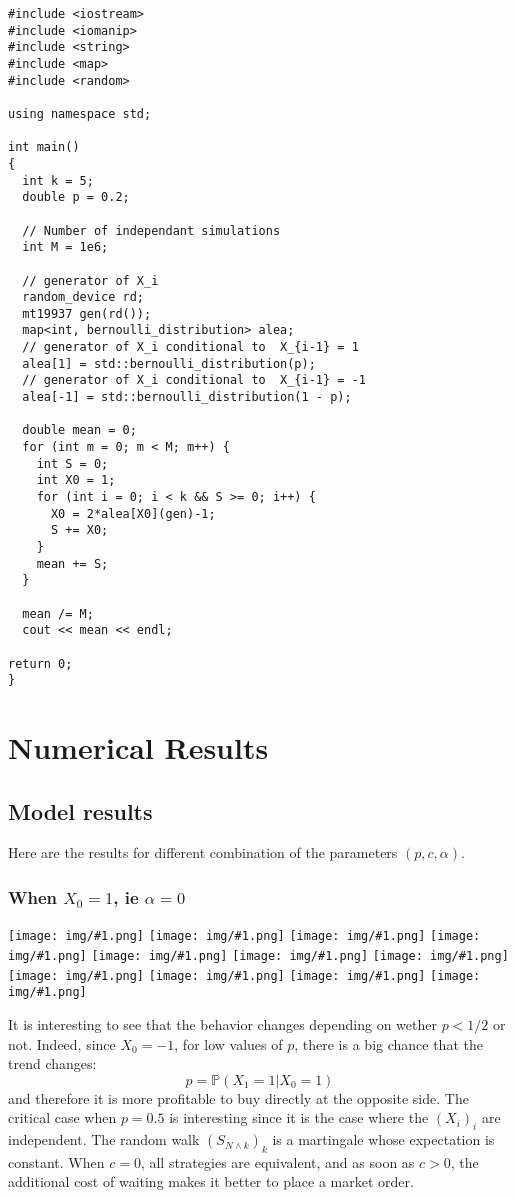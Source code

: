 \documentclass{article}
\newcommand{\Min}[2]{ {#1} \wedge {#2} }
\newcommand{\IMG}[1] { \texttt{[image: img/\#1.png]} }
\newcommand{\IMGG}[1] { \texttt{[image: img/\#1.png]} }
\begin{document}
\begin{verbatim}
#include <iostream>
#include <iomanip>
#include <string>
#include <map>
#include <random>

using namespace std;

int main()
{
  int k = 5;
  double p = 0.2;

  // Number of independant simulations
  int M = 1e6;

  // generator of X_i
  random_device rd;
  mt19937 gen(rd());
  map<int, bernoulli_distribution> alea;
  // generator of X_i conditional to  X_{i-1} = 1
  alea[1] = std::bernoulli_distribution(p);
  // generator of X_i conditional to  X_{i-1} = -1
  alea[-1] = std::bernoulli_distribution(1 - p);
  
  double mean = 0;
  for (int m = 0; m < M; m++) {
    int S = 0;
    int X0 = 1;
    for (int i = 0; i < k && S >= 0; i++) {
      X0 = 2*alea[X0](gen)-1;
      S += X0;
    }
    mean += S;
  }
  
  mean /= M;
  cout << mean << endl;
  
return 0;
}
\end{verbatim}

\newpage

\section{Numerical Results}

\subsection{Model results}
Here are the results for different combination of the parameters $(p, c, \alpha)$.
\subsubsection*{When $X_0 = 1$, ie $\alpha=0$}

\begin{center}
\IMGG{legend}
\IMG{0}
\IMG{1} 
\IMG{2} 
\IMG{3} 
\IMG{4} 
\IMG{5} 
\IMG{7} 
\IMG{8} 
\IMG{9} 
\IMG{10}
\end{center}
It is interesting to see that the behavior changes depending on wether $p < 1/2$ or not. Indeed, since $X_0 = -1$, for low values of $p$, there is a big chance that the trend changes:
$$ p = \mathbb P (X_1 = 1 | X_0 = 1) $$ and therefore it is more profitable to buy directly at the opposite side.
The critical case when $p = 0.5$ is interesting since it is the case where the $(X_i)_i$ are independent. The random walk $(S_{\Min N k})_k$ is a martingale whose expectation is constant. When $c = 0$, all strategies are equivalent, and as soon as $c > 0$, the additional cost of waiting makes it better to place a market order.
\end{document}
